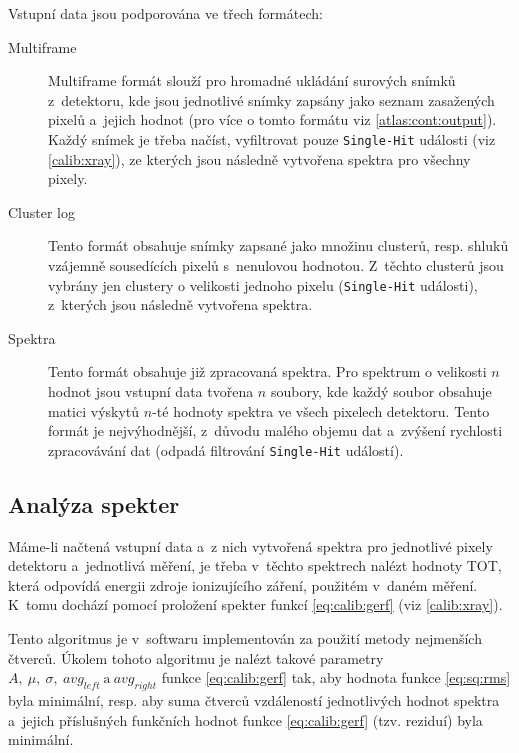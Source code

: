 Vstupní data jsou podporována ve třech formátech:
\begin{description}
	\item[Multiframe] Multiframe formát slouží pro hromadné ukládání surových snímků z~detektoru, kde jsou jednotlivé snímky zapsány jako seznam zasažených pixelů a~jejich hodnot (pro více o tomto formátu viz \ref{atlas:cont:output}). Každý snímek je třeba načíst, vyfiltrovat pouze \texttt{Single-Hit} události (viz \ref{calib:xray}), ze kterých jsou následně vytvořena spektra pro všechny pixely.
	\item[Cluster log] Tento formát obsahuje snímky zapsané jako množinu clusterů, resp. shluků vzájemně sousedících pixelů s~nenulovou hodnotou. Z~těchto clusterů jsou vybrány jen clustery o velikosti jednoho pixelu (\texttt{Single-Hit} události), z~kterých jsou následně vytvořena spektra.
	\item[Spektra] Tento formát obsahuje již zpracovaná spektra. Pro spektrum o velikosti $n$ hodnot jsou vstupní data tvořena $n$ soubory, kde každý soubor obsahuje matici výskytů $n$-té hodnoty spektra ve všech pixelech detektoru. Tento formát je nejvýhodnější, z~důvodu malého objemu dat a~zvýšení rychlosti zpracovávání dat (odpadá filtrování \texttt{Single-Hit} událostí).
\end{description}


\subsection{Analýza spekter}\label{calib:sw:spektra}
Máme-li načtená vstupní data a~z nich vytvořená spektra pro jednotlivé pixely detektoru a~jednotlivá měření, je třeba v~těchto spektrech nalézt hodnoty TOT, která odpovídá energii zdroje ionizujícího záření, použitém v~daném měření. K~tomu dochází pomocí proložení spekter funkcí \ref{eq:calib:gerf} (viz \ref{calib:xray}). 

Tento algoritmus je v~softwaru implementován za použití metody nejmenších čtverců. Úkolem tohoto algoritmu je nalézt takové parametry $A,~\mu,~\sigma,~avg_{left}~\text{a}~avg_{right}$ funkce \ref{eq:calib:gerf} tak, aby hodnota funkce \ref{eq:sq:rms} byla minimální, resp. aby suma čtverců vzdáleností jednotlivých hodnot spektra a~jejich příslušných funkčních hodnot funkce \ref{eq:calib:gerf} (tzv. reziduí) byla minimální.

